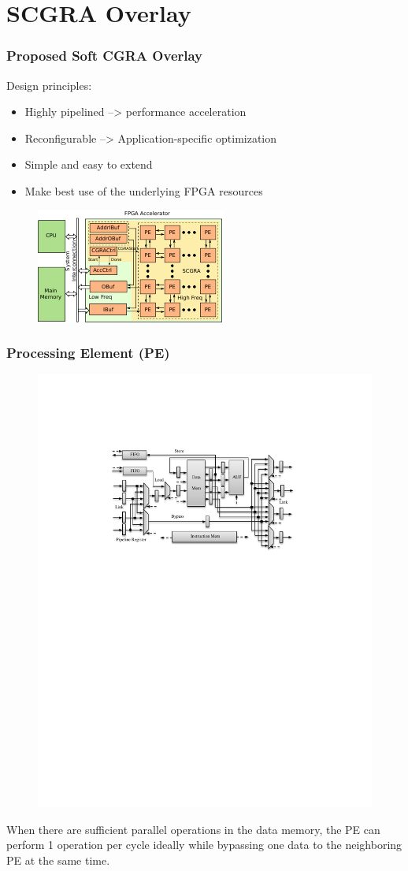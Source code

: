 \documentclass[accentcolor=tud1a,colorbacktitle,inverttitle,landscape,german,presentation,t]{tudbeamer}
\begin{document}
\section{SCGRA Overlay}
  \begin{frame}
  \frametitle{Proposed Soft CGRA Overlay}
  Design principles:
  \begin{itemize}
  \item Highly pipelined --> performance acceleration
  \item Reconfigurable --> Application-specific optimization
  \item Simple and easy to extend
  \item Make best use of the underlying FPGA resources
  \end{itemize}

  \begin{figure}
     \includegraphics[width=.6\linewidth]{scgra-accelerator}
  \end{figure}
  \end{frame}

  \begin{frame}
  \frametitle{Processing Element (PE)}
  \vspace{1em}
  \begin{figure}
     \includegraphics[width=.75\linewidth]{pe}
  \end{figure}
 When there are sufficient parallel operations in the data memory, the PE can perform 1 operation per cycle ideally while bypassing one data to the neighboring PE at the same time.
  \end{frame}
\end{document}
